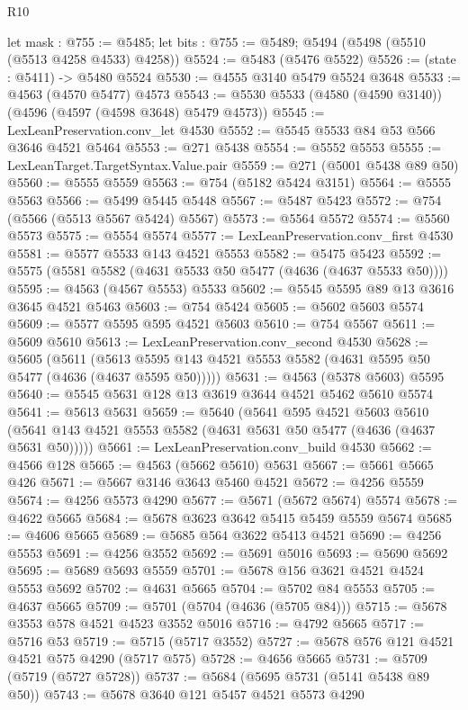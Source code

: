 \begin{lexlean}{R10}
\begin{coremodule}
  let mask : @755 := @5485;
  let bits : @755 := @5489; @5494 (@5498 (@5510 (@5513 @4258 @4533) @4258))
@5524 := @5483 (@5476 @5522)
@5526 := (state : @5411) -> @5480 @5524
@5530 := @4555 @3140 @5479 @5524 @3648
@5533 := @4563 (@4570 @5477) @4573
@5543 := @5530 @5533 (@4580 (@4590 @3140)) (@4596 (@4597 (@4598 @3648) @5479 @4573))
@5545 := LexLeanPreservation.conv_let @4530
@5552 := @5545 @5533 @84 @53 @566 @3646 @4521 @5464
@5553 := @271 @5438
@5554 := @5552 @5553
@5555 := LexLeanTarget.TargetSyntax.Value.pair
@5559 := @271 (@5001 @5438 @89 @50)
@5560 := @5555 @5559
@5563 := @754 (@5182 @5424 @3151)
@5564 := @5555 @5563
@5566 := @5499 @5445 @5448
@5567 := @5487 @5423
@5572 := @754 (@5566 (@5513 @5567 @5424) @5567)
@5573 := @5564 @5572
@5574 := @5560 @5573
@5575 := @5554 @5574
@5577 := LexLeanPreservation.conv_first @4530
@5581 := @5577 @5533 @143 @4521 @5553
@5582 := @5475 @5423
@5592 := @5575 (@5581 @5582 (@4631 @5533 @50 @5477 (@4636 (@4637 @5533 @50))))
@5595 := @4563 (@4567 @5553) @5533
@5602 := @5545 @5595 @89 @13 @3616 @3645 @4521 @5463
@5603 := @754 @5424
@5605 := @5602 @5603 @5574
@5609 := @5577 @5595 @595 @4521 @5603
@5610 := @754 @5567
@5611 := @5609 @5610
@5613 := LexLeanPreservation.conv_second @4530
@5628 := @5605
    (@5611 (@5613 @5595 @143 @4521 @5553 @5582 (@4631 @5595 @50 @5477 (@4636 (@4637 @5595 @50)))))
@5631 := @4563 (@5378 @5603) @5595
@5640 := @5545 @5631 @128 @13 @3619 @3644 @4521 @5462 @5610 @5574
@5641 := @5613 @5631
@5659 := @5640
    (@5641
      @595
      @4521
      @5603
      @5610
      (@5641 @143 @4521 @5553 @5582 (@4631 @5631 @50 @5477 (@4636 (@4637 @5631 @50)))))
@5661 := LexLeanPreservation.conv_build @4530
@5662 := @4566 @128
@5665 := @4563 (@5662 @5610) @5631
@5667 := @5661 @5665 @426
@5671 := @5667 @3146 @3643 @5460 @4521
@5672 := @4256 @5559
@5674 := @4256 @5573 @4290
@5677 := @5671 (@5672 @5674) @5574
@5678 := @4622 @5665
@5684 := @5678 @3623 @3642 @5415 @5459 @5559 @5674
@5685 := @4606 @5665
@5689 := @5685 @564 @3622 @5413 @4521
@5690 := @4256 @5553
@5691 := @4256 @3552
@5692 := @5691 @5016
@5693 := @5690 @5692
@5695 := @5689 @5693 @5559
@5701 := @5678 @156 @3621 @4521 @4524 @5553 @5692
@5702 := @4631 @5665
@5704 := @5702 @84 @5553
@5705 := @4637 @5665
@5709 := @5701 (@5704 (@4636 (@5705 @84)))
@5715 := @5678 @3553 @578 @4521 @4523 @3552 @5016
@5716 := @4792 @5665
@5717 := @5716 @53
@5719 := @5715 (@5717 @3552)
@5727 := @5678 @576 @121 @4521 @4521 @575 @4290 (@5717 @575)
@5728 := @4656 @5665
@5731 := @5709 (@5719 (@5727 @5728))
@5737 := @5684 (@5695 @5731 (@5141 @5438 @89 @50))
@5743 := @5678 @3640 @121 @5457 @4521 @5573 @4290

\end{coremodule}
\end{lexlean}
